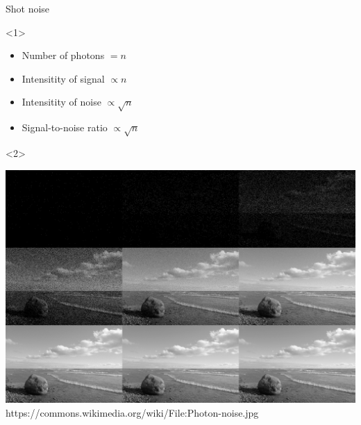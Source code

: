 \documentclass{beamer}
\begin{document}
\begin{frame}{Shot noise}
    \begin{onlyenv}<1>
        \begin{itemize}
            \item Number of photons $= n$
            \item Intensitity of signal $\propto n$
            \item Intensitity of noise $\propto \sqrt n$
            \item Signal-to-noise ratio $\propto \sqrt n$
        \end{itemize}
    \end{onlyenv}

    \begin{onlyenv}<2>
        \begin{center}
            \includegraphics[height=0.6\textheight]{shot.jpg}\\
            https://commons.wikimedia.org/wiki/File:Photon-noise.jpg
        \end{center}
    \end{onlyenv}
\end{frame}
\end{document}
